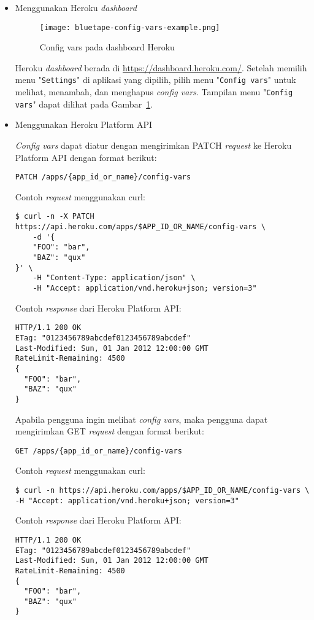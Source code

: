 \begin{itemize}
\item Menggunakan Heroku \textit{dashboard}
\begin{figure}[H]
	\centering  
	\texttt{[image: bluetape-config-vars-example.png]}  
	\caption[Config vars pada dashboard Heroku]{Config vars pada dashboard Heroku} 
	\label{fig:bluetape-config-vars-example} 
\end{figure}

Heroku \textit{dashboard} berada di \url{https://dashboard.heroku.com/}. Setelah memilih menu "\texttt{Settings}" di aplikasi yang dipilih, pilih menu "\texttt{Config vars}" untuk melihat, menambah, dan menghapus \textit{config vars}. Tampilan menu "\texttt{Config vars}" dapat dilihat pada Gambar~\ref{fig:bluetape-config-vars-example}.

\item Menggunakan Heroku Platform API

\textit{Config vars} dapat diatur dengan mengirimkan PATCH \textit{request} ke Heroku Platform API dengan format berikut: 
\begin{lstlisting}
PATCH /apps/{app_id_or_name}/config-vars
\end{lstlisting}
Contoh \textit{request} menggunakan curl:
\begin{lstlisting}
$ curl -n -X PATCH https://api.heroku.com/apps/$APP_ID_OR_NAME/config-vars \
	-d '{
	"FOO": "bar",
	"BAZ": "qux"
}' \
	-H "Content-Type: application/json" \
	-H "Accept: application/vnd.heroku+json; version=3"
\end{lstlisting}
Contoh \textit{response} dari Heroku Platform API:
\begin{lstlisting}
HTTP/1.1 200 OK
ETag: "0123456789abcdef0123456789abcdef"
Last-Modified: Sun, 01 Jan 2012 12:00:00 GMT
RateLimit-Remaining: 4500
{
  "FOO": "bar",
  "BAZ": "qux"
}
\end{lstlisting}

Apabila pengguna ingin melihat \textit{config vars}, maka pengguna dapat mengirimkan GET \textit{request} dengan format berikut: 
\begin{lstlisting}
GET /apps/{app_id_or_name}/config-vars
\end{lstlisting}
Contoh \textit{request} menggunakan curl:
\begin{lstlisting}
$ curl -n https://api.heroku.com/apps/$APP_ID_OR_NAME/config-vars \
-H "Accept: application/vnd.heroku+json; version=3"
\end{lstlisting}
Contoh \textit{response} dari Heroku Platform API:
\begin{lstlisting}
HTTP/1.1 200 OK
ETag: "0123456789abcdef0123456789abcdef"
Last-Modified: Sun, 01 Jan 2012 12:00:00 GMT
RateLimit-Remaining: 4500
{
  "FOO": "bar",
  "BAZ": "qux"
}
\end{lstlisting}
\end{itemize}

